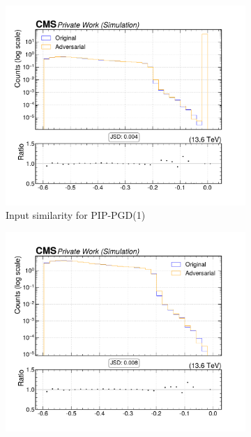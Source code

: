 \begin{figure}[htbp]
  \centering
  \begin{subfigure}[t]{0.32\textwidth}
    \includegraphics[width=\linewidth]{media/output/features/compare/combined_it_1/cmp_npf_arr_Npfcan_deltaR.pdf}
    \caption*{Input similarity for PIP-PGD(1)}
  \end{subfigure}\hfill
  \begin{subfigure}[t]{0.32\textwidth}
    \includegraphics[width=\linewidth]{media/output/features/compare/combined_it_2/cmp_npf_arr_Npfcan_deltaR.pdf}

\end{subfigure}
\end{figure}
